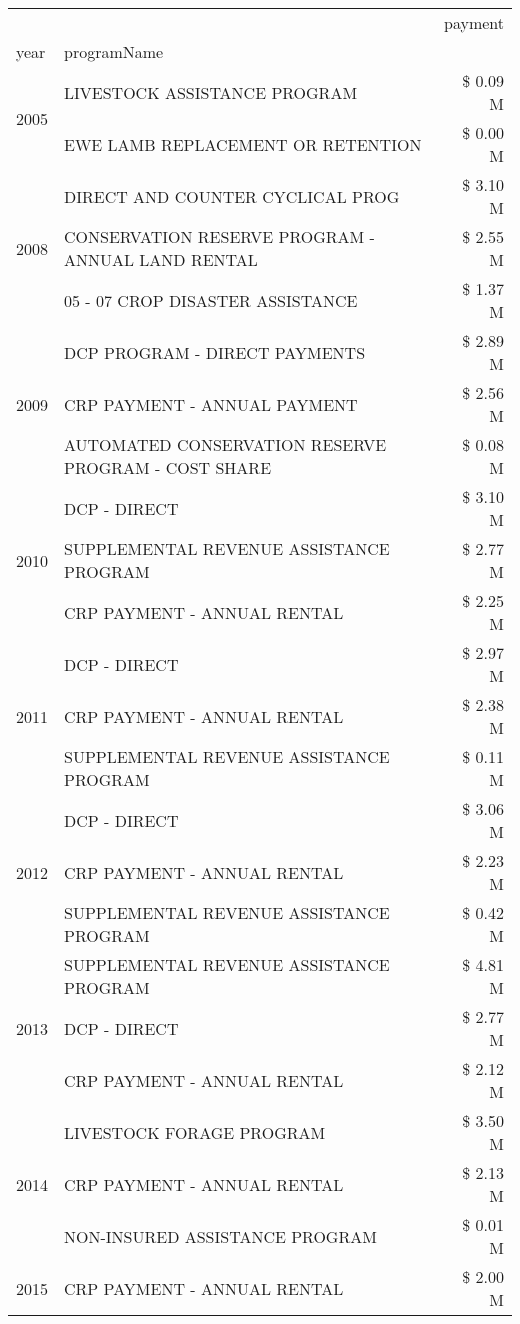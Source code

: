 \begin{tabular}{llr}
\toprule
 &  & payment \\
year & programName &  \\
\midrule
\multirow[t]{2}{*}{2005} & LIVESTOCK ASSISTANCE PROGRAM & \$ 0.09 M \\
 & EWE LAMB REPLACEMENT OR RETENTION & \$ 0.00 M \\
\cline{1-3}
\multirow[t]{3}{*}{2008} & DIRECT AND COUNTER CYCLICAL PROG & \$ 3.10 M \\
 & CONSERVATION RESERVE PROGRAM - ANNUAL LAND RENTAL & \$ 2.55 M \\
 & 05 - 07 CROP DISASTER ASSISTANCE & \$ 1.37 M \\
\cline{1-3}
\multirow[t]{3}{*}{2009} & DCP PROGRAM - DIRECT PAYMENTS & \$ 2.89 M \\
 & CRP PAYMENT - ANNUAL PAYMENT & \$ 2.56 M \\
 & AUTOMATED CONSERVATION RESERVE PROGRAM - COST SHARE & \$ 0.08 M \\
\cline{1-3}
\multirow[t]{3}{*}{2010} & DCP - DIRECT & \$ 3.10 M \\
 & SUPPLEMENTAL REVENUE ASSISTANCE PROGRAM & \$ 2.77 M \\
 & CRP PAYMENT - ANNUAL RENTAL & \$ 2.25 M \\
\cline{1-3}
\multirow[t]{3}{*}{2011} & DCP - DIRECT & \$ 2.97 M \\
 & CRP PAYMENT - ANNUAL RENTAL & \$ 2.38 M \\
 & SUPPLEMENTAL REVENUE ASSISTANCE PROGRAM & \$ 0.11 M \\
\cline{1-3}
\multirow[t]{3}{*}{2012} & DCP - DIRECT & \$ 3.06 M \\
 & CRP PAYMENT - ANNUAL RENTAL & \$ 2.23 M \\
 & SUPPLEMENTAL REVENUE ASSISTANCE PROGRAM & \$ 0.42 M \\
\cline{1-3}
\multirow[t]{3}{*}{2013} & SUPPLEMENTAL REVENUE ASSISTANCE PROGRAM & \$ 4.81 M \\
 & DCP - DIRECT & \$ 2.77 M \\
 & CRP PAYMENT - ANNUAL RENTAL & \$ 2.12 M \\
\cline{1-3}
\multirow[t]{3}{*}{2014} & LIVESTOCK FORAGE PROGRAM & \$ 3.50 M \\
 & CRP PAYMENT - ANNUAL RENTAL & \$ 2.13 M \\
 & NON-INSURED ASSISTANCE PROGRAM & \$ 0.01 M \\
\cline{1-3}
\multirow[t]{3}{*}{2015} & CRP PAYMENT - ANNUAL RENTAL & \$ 2.00 M \\

\end{tabular}
